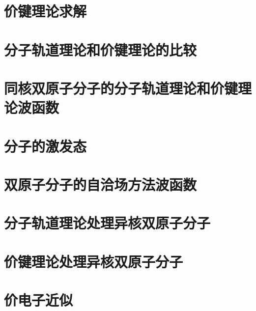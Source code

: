 \section{价键理论求解}
\label{sec:13.10 The Valence-Bond Treatment of H2}

\section{分子轨道理论和价键理论的比较}
\label{sec:13.11 Comparison of the MO and VB Theories}

\section{同核双原子分子的分子轨道理论和价键理论波函数}
\label{sec:13.12 MO and VB Wave Functions for Homonuclear Diatomic Molecules}

\section{分子的激发态}
\label{sec:13.13 Excited States of H2}

\section{双原子分子的自洽场方法波函数}
\label{sec:13.14 SCF Wave Functions for Diatomic Molecules}

\section{分子轨道理论处理异核双原子分子}
\label{sec:13.15 MO Treatment of Heteronuclear Diatomic Molecules}

\section{价键理论处理异核双原子分子}
\label{sec:13.16 VB Treatment of Heteronuclear Diatomic Molecules}

\section{价电子近似}
\label{sec:13.17 The Valence-Electron Approximation}